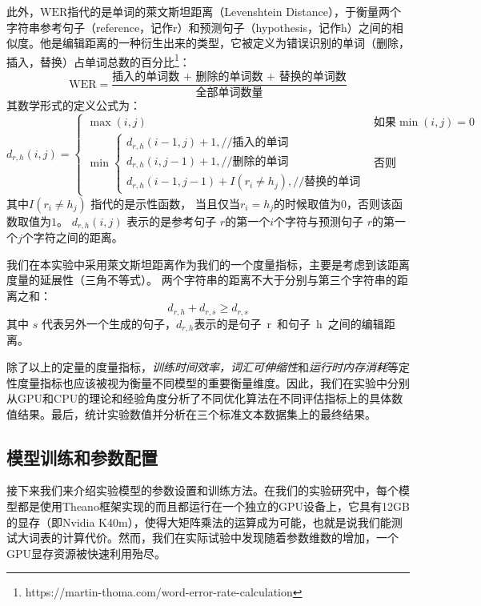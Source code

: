 此外，$\mathrm{WER}$指代的是单词的萊文斯坦距离（Levenshtein Distance），于衡量两个字符串参考句子（reference，记作r）和预测句子（hypothesis，记作h）之间的相似度。他是编辑距离的一种衍生出来的类型，它被定义为错误识别的单词（删除，插入，替换）占单词总数的百分比\footnote{https://martin-thoma.com/word-error-rate-calculation}：
\begin{equation}\label{equ:wer}
  \mathrm{WER} = \frac{\text{插入的单词数 + 删除的单词数 + 替换的单词数}}{\text{全部单词数量}}
\end{equation}
其数学形式的定义公式为：
\begin{equation}\label{equ:distance}
d_{r,h}(i,j) =  \begin{cases}
\max (i,j)& \text{如果}\min(i,j)=0\\
\min  \begin{cases}
d_{r,h}(i - 1,j) + 1,\text{//插入的单词}\\
d_{r,h}(i,j - 1) + 1,\text{//删除的单词}\\
d_{r,h}(i - 1,j - 1) + I{(r_i\neq h_j)},\text{//替换的单词}
\end{cases} &\text{否则}
\end{cases}
\end{equation}
其中$I{(r_i\neq h_j)}$ 指代的是示性函数， 当且仅当$r_i= h_j$的时候取值为$0$，否则该函数取值为$1$。 $d_{r,h}(i,j)$ 表示的是参考句子 $r$的第一个$i$个字符与预测句子 $r$的第一个$j$个字符之间的距离。

我们在本实验中采用萊文斯坦距离作为我们的一个度量指标，主要是考虑到该距离度量的延展性（三角不等式）。 两个字符串的距离不大于分别与第三个字符串的距离之和：
\begin{equation}
d_{r,h}+d_{r,s}\ge d_{r,s}
\end{equation}
其中 $s$ 代表另外一个生成的句子，$d_{r,h}$表示的是句子~r~和句子~h~之间的编辑距离。

除了以上的定量的度量指标，\textit{训练时间效率，词汇可伸缩性}和\textit{运行时内存消耗}等定性度量指标也应该被视为衡量不同模型的重要衡量维度。因此，我们在实验中分别从GPU和CPU的理论和经验角度分析了不同优化算法在不同评估指标上的具体数值结果。最后，统计实验数值并分析在三个标准文本数据集上的最终结果。

\subsection{模型训练和参数配置}
接下来我们来介绍实验模型的参数设置和训练方法。在我们的实验研究中，每个模型都是使用Theano框架实现的而且都运行在一个独立的GPU设备上，它具有12GB的显存（即Nvidia K40m），使得大矩阵乘法的运算成为可能，也就是说我们能测试大词表的计算代价。然而，我们在实际试验中发现随着参数维数的增加，一个GPU显存资源被快速利用殆尽。

